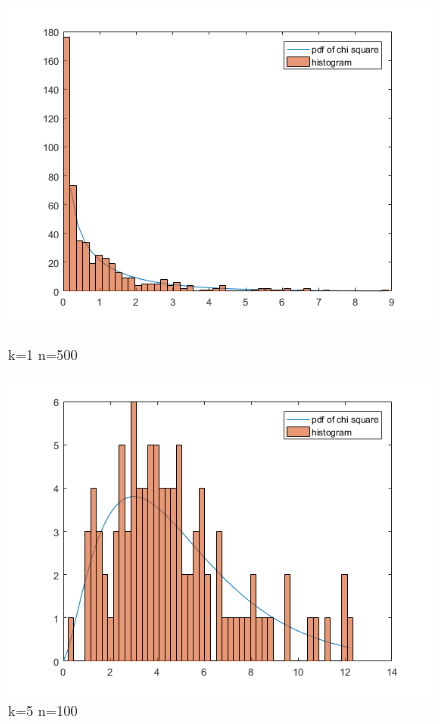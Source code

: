 \documentclass[10pt,a4paper]{report}
\begin{document}
\begin{figure}[ht]
\begin{minipage}[b]{0.5\linewidth}
\centering
\includegraphics[width=\textwidth]{k1n500.png}
\caption{k=1 n=500}
\end{minipage}
\hspace{0.5cm}
\begin{minipage}[b]{0.5\linewidth}
\centering
\includegraphics[width=\textwidth]{k5n100.png}
\caption{k=5 n=100}
\end{minipage}
\end{figure}
\end{document}

